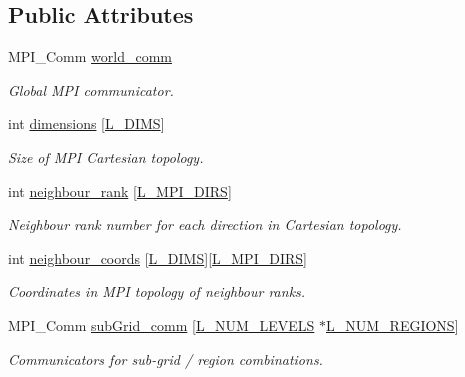 \subsection*{Public Attributes}
\begin{DoxyCompactItemize}
\item 
M\+P\+I\+\_\+\+Comm \hyperlink{class_mpi_manager_aec1ed834d1a8fa19f87499fb0d5cd332}{world\+\_\+comm}
\begin{DoxyCompactList}\small\item\em Global M\+PI communicator. \end{DoxyCompactList}\item 
int \hyperlink{class_mpi_manager_a8d486f77671328cdc139f6cef2a4006f}{dimensions} \mbox{[}\hyperlink{definitions_8h_a31d5945080ee5c34edc32e6f74c724c8}{L\+\_\+\+D\+I\+MS}\mbox{]}
\begin{DoxyCompactList}\small\item\em Size of M\+PI Cartesian topology. \end{DoxyCompactList}\item 
int \hyperlink{class_mpi_manager_af2891954ff504c12ec6d5f845e906f28}{neighbour\+\_\+rank} \mbox{[}\hyperlink{definitions_8h_a144328eed4e90ebcf8a9f66aa7337266}{L\+\_\+\+M\+P\+I\+\_\+\+D\+I\+RS}\mbox{]}
\begin{DoxyCompactList}\small\item\em Neighbour rank number for each direction in Cartesian topology. \end{DoxyCompactList}\item 
int \hyperlink{class_mpi_manager_a5a7268347fcab916adc61bee47e9f626}{neighbour\+\_\+coords} \mbox{[}\hyperlink{definitions_8h_a31d5945080ee5c34edc32e6f74c724c8}{L\+\_\+\+D\+I\+MS}\mbox{]}\mbox{[}\hyperlink{definitions_8h_a144328eed4e90ebcf8a9f66aa7337266}{L\+\_\+\+M\+P\+I\+\_\+\+D\+I\+RS}\mbox{]}
\begin{DoxyCompactList}\small\item\em Coordinates in M\+PI topology of neighbour ranks. \end{DoxyCompactList}\item 
M\+P\+I\+\_\+\+Comm \hyperlink{class_mpi_manager_a0926101699de914f6be018885bea25b1}{sub\+Grid\+\_\+comm} \mbox{[}\hyperlink{definitions_8h_a2ce7c3facc5f789b0e201757516539a5}{L\+\_\+\+N\+U\+M\+\_\+\+L\+E\+V\+E\+LS} $\ast$\hyperlink{definitions_8h_a3efeae83589481193d81da498e7f746a}{L\+\_\+\+N\+U\+M\+\_\+\+R\+E\+G\+I\+O\+NS}\mbox{]}
\begin{DoxyCompactList}\small\item\em Communicators for sub-\/grid / region combinations. \end{DoxyCompactList}\item 

\end{DoxyCompactItemize}

